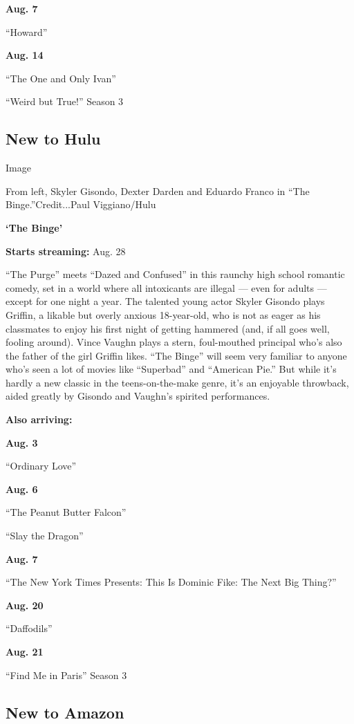 \textbf{Aug. 7}

``Howard''

\textbf{Aug. 14}

``The One and Only Ivan''

``Weird but True!'' Season 3

\hypertarget{new-to-hulu}{%
\subsection{New to Hulu}\label{new-to-hulu}}

Image

From left, Skyler Gisondo, Dexter Darden and Eduardo Franco in ``The
Binge.''Credit...Paul Viggiano/Hulu

\textbf{`The Binge'}

\textbf{Starts streaming:} Aug. 28

``The Purge'' meets ``Dazed and Confused'' in this raunchy high school
romantic comedy, set in a world where all intoxicants are illegal ---
even for adults --- except for one night a year. The talented young
actor Skyler Gisondo plays Griffin, a likable but overly anxious
18-year-old, who is not as eager as his classmates to enjoy his first
night of getting hammered (and, if all goes well, fooling around). Vince
Vaughn plays a stern, foul-mouthed principal who's also the father of
the girl Griffin likes. ``The Binge'' will seem very familiar to anyone
who's seen a lot of movies like ``Superbad'' and ``American Pie.'' But
while it's hardly a new classic in the teens-on-the-make genre, it's an
enjoyable throwback, aided greatly by Gisondo and Vaughn's spirited
performances.

\textbf{Also arriving:}

\textbf{Aug. 3}

``Ordinary Love''

\textbf{Aug. 6}

``The Peanut Butter Falcon''

``Slay the Dragon''

\textbf{Aug. 7}

``The New York Times Presents: This Is Dominic Fike: The Next Big
Thing?''

\textbf{Aug. 20}

``Daffodils''

\textbf{Aug. 21}

``Find Me in Paris'' Season 3

\hypertarget{new-to-amazon}{%
\subsection{New to Amazon}\label{new-to-amazon}}

